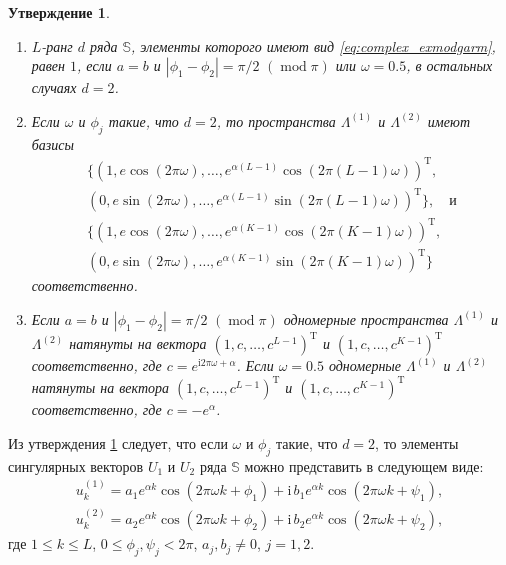 \documentclass[specialist,
               substylefile = spbu.rtx,
               subf,href,colorlinks=true, 12pt]{disser}
\def\mod{\mathop{\mathrm{mod}}}
\newcommand{\I}{\mathrm{i}}
\newtheorem{Th}{Утверждение}
\begin{document}
\begin{Th} \cite[Утверждение 3]{Zhornikova2016} \label{th:cssa_ex_mod_im_vec}
\begin{enumerate}
\item $L$-ранг $d$ ряда $\mathbb{S}$, элементы которого имеют вид \eqref{eq:complex_exmodgarm},  равен $1$, если $a=b$ и $|\phi_1 - \phi_2| = \pi/2 \,\,(\mod \pi)$ или $\omega = 0.5$, в остальных случаях $d=2$.
\item Если $\omega$ и $\phi_j$ такие, что $d = 2$, то пространства $\Lambda^{(1)}$ и $\Lambda^{(2)}$ имеют базисы
\begin{gather*}
\{(1, e\cos(2\pi\omega),\ldots,e^{\alpha (L-1)}\cos(2\pi (L-1) \omega))^{\mathrm{T}}, \\
(0, e\sin(2\pi\omega),\ldots,e^{\alpha (L-1)}\sin(2\pi (L-1) \omega))^{\mathrm{T}}\},  \quad \text{и} \\
\{(1, e\cos(2\pi\omega),\ldots,e^{\alpha (K-1)}\cos(2\pi (K-1) \omega))^{\mathrm{T}}, \\
(0, e\sin(2\pi\omega),\ldots,e^{\alpha (K-1)}\sin(2\pi (K-1) \omega))^{\mathrm{T}}\}
\end{gather*}
соответственно.
\item Если
 $a=b$ и $|\phi_1 - \phi_2| = \pi/2 \,\,(\mod \pi)$ одномерные пространства $\Lambda^{(1)}$ и $\Lambda^{(2)}$ натянуты на вектора $(1,c,\ldots,c^{L-1})^{\mathrm{T}}$ и $(1,c,\ldots,c^{K-1})^{\mathrm{T}}$ соответственно, где $c = e^{\I 2\pi\omega + \alpha}$. Если $\omega = 0.5$ одномерные $\Lambda^{(1)}$ и $\Lambda^{(2)}$ натянуты на вектора $(1,c,\ldots,c^{L-1})^{\mathrm{T}}$ и $(1,c,\ldots,c^{K-1})^{\mathrm{T}}$ соответственно, где $c = -e^{\alpha}$.
\end{enumerate}
\end{Th}

 Из утверждения \ref{th:cssa_ex_mod_im_vec} следует, что если $\omega$ и $\phi_j$ такие, что $d = 2$, то элементы сингулярных векторов $U_1$ и $U_2$ ряда $\mathbb{S}$ можно представить в следующем виде:
\begin{gather} \label{eq:uuu1}
	u_k^{(1)} = a_1 e^{\alpha k} \cos(2\pi\omega k + \phi_1) + \I \, b_1 e^{\alpha k} \cos(2\pi\omega k + \psi_1),\\ \label{eq:uuu2}
	u_k^{(2)} = a_2 e^{\alpha k}\cos(2\pi\omega k + \phi_2)+ \I \, b_2 e^{\alpha k} \cos(2\pi\omega k + \psi_2),
\end{gather}
где $1 \leqslant k \leqslant L$, $0 \leqslant \phi_j, \psi_j < 2\pi$, $a_j, b_j \not = 0$, $j=1,2$.
\end{document}
